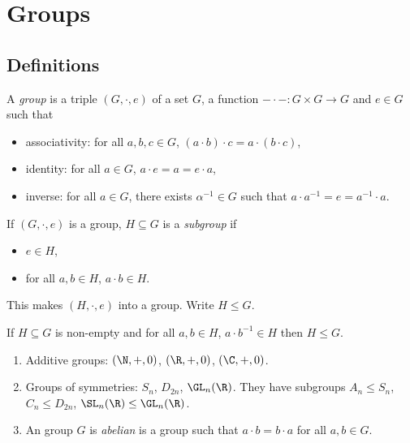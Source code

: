 \documentclass[a4paper]{article}
\theoremstyle{definition}
\begin{document}


\tableofcontents

\section{Groups}

\subsection{Definitions}

\begin{definition}[Group]
  A \emph{group} is a triple \((G, \cdot, e)\) of a set \(G\), a function \(- \cdot -: G \times G \to G\) and \(e \in G\) such that
  \begin{itemize}
  \item associativity: for all \(a, b, c \in G\), \((a \cdot b) \cdot c = a \cdot (b \cdot c)\),
  \item identity: for all \(a \in G\), \(a \cdot e = a = e \cdot a\),
  \item inverse: for all \(a \in G\), there exists \(\alpha^{-1} \in G\) such that \(a \cdot a^{-1} = e = a^{-1} \cdot a\).
  \end{itemize}
\end{definition}

\begin{definition}[Subgroup]
  If \((G, \cdot, e)\) is a group, \(H \subseteq G\) is a \emph{subgroup} if
  \begin{itemize}
  \item \(e \in H\),
  \item for all \(a, b \in H\), \(a \cdot b \in H\).
  \end{itemize}
  This makes \((H, \cdot, e)\) into a group. Write \(H \leq G\).
\end{definition}

\begin{lemma}
  If \(H \subseteq G\) is non-empty and for all \(a, b \in H\), \(a \cdot b^{-1} \in H\) then \(H \leq G\).
\end{lemma}

\begin{eg}\leavevmode
  \begin{enumerate}
  \item Additive groups: \((\N, +, 0)\), \((\R, +, 0)\), \((\C, +, 0)\).
  \item Groups of symmetries: \(S_n\), \(D_{2n}\), \(\GL_n(\R)\). They have subgroups \(A_n \leq S_n\), \(C_n \leq D_{2n}\), \(\SL_n(\R) \leq \GL_n(\R)\).
  \item An group \(G\) is \emph{abelian} is a group such that \(a \cdot b = b \cdot a\) for all \(a, b \in G\).
  \end{enumerate}
\end{eg}
\end{document}
